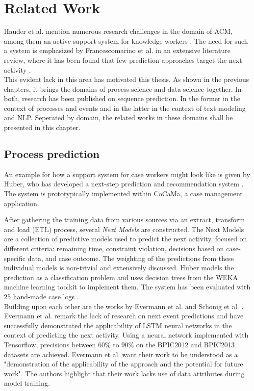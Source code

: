 \chapter{Related Work}\label{chap:related-work}
Hauder et al. mention numerous research challenges in the domain of ACM, among them an active support system for knowledge workers \cite{hauder2014}.
The need for such a system is emphasized by Francescomarino et al. in an extensive literature review, where it has been found that few prediction approaches target the next activity \cite{francescomarino2018}.\\

This evident lack in this area has motivated this thesis. As shown in the previous chapters, it brings the domains of process science and data science together. In both, research has been published on sequence prediction. In the former in the context of processes and events and in the latter in the context of text modeling and NLP. Seperated by domain, the related works in these domains shall be presented in this chapter.

\section{Process prediction}
An example for how a support system \cite{hauder2014} for case workers might look like is given by Huber, who has developed a next-step prediction and recommendation system  \cite{huber2015}. The system is prototypically implemented within CoCaMa, a case management application.

After gathering the training data from various sources via an extract, transform and load (ETL) process, several \textit{Next Models} are constructed. The Next Models are a collection of predictive models used to predict the next activity, focused on different criteria: remaining time, constraint violation, decisions based on case-specific data, and case outcome. The weighting of the predictions from these individual models is non-trivial and extensively discussed. Huber models the prediction as a classification problem and uses decision trees from the WEKA \cite{web:weka} machine learning toolkit to implement them. The system has been evaluated with 25 hand-made case logs \cite{huber2015}.\\

Building upon each other are the works by Evermann et al. \cite{evermann2016} and Schönig et al. \cite{schoenig2018}. Evermann et al. remark the lack of research on next event predictions and have successfully demonstrated the applicability of LSTM neural networks in the context of predicting the next activity. Using a neural network implemented with Tensorflow, precisions between $60\%$ to $90\%$ on the BPIC2012 and BPIC2013 datasets are achieved. Evermann et al. want their work to be understood as a "demonstration of the applicability of the approach and the potential for future work". The authors highlight that their work lacks use of data attributes during model training.

